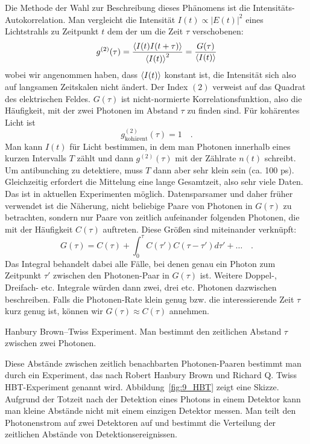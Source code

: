 Die Methode der Wahl zur Beschreibung dieses Phänomens ist die Intensitäts-Autokorrelation. Man vergleicht die Intensität $I(t) \propto |E(t)|^2$ eines Lichtstrahls zu Zeitpunkt $t$ dem der um die Zeit $\tau$ verschobenen:
\begin{equation}
    g^{(2)}(\tau) = \frac{\braket{I(t) I(t+ \tau)}}{\braket{I(t)}^2} =  \frac{G(\tau)}{\braket{I(t)}}
\end{equation}
wobei wir angenommen haben, dass $\braket{I(t)}$ konstant ist, die Intensität sich also auf langsamen Zeitskalen nicht ändert.
Der Index $(2)$ verweist auf das Quadrat des elektrischen Feldes. $G(\tau)$ ist nicht-normierte Korrelationsfunktion, also die Häufigkeit, mit der  zwei Photonen im Abstand $\tau$ zu finden sind. Für kohärentes Licht ist 
\begin{equation}
    g^{(2)}_\text{kohärent}(\tau) = 1 \quad .
\end{equation}
Man kann $I(t)$ für Licht bestimmen, in dem man Photonen innerhalb eines kurzen Intervalls $T$ zählt und dann $ g^{(2)}(\tau)$ mit der Zählrate $n(t)$ schreibt. Um antibunching zu detektiere, muss $T$ dann aber sehr klein sein (ca. 100 ps). Gleichzeitig erfordert die Mittelung eine lange Gesamtzeit, also sehr viele Daten. Das ist in aktuellen Experimenten möglich. Datensparsamer und daher früher verwendet ist die Näherung, nicht beliebige Paare von Photonen in  $G(\tau)$ zu betrachten, sondern nur Paare von zeitlich aufeinander folgenden Photonen, die mit der Häufigkeit $C(\tau)$ auftreten. Diese Größen sind miteinander verknüpft:
\begin{equation}
    G(\tau) = C(\tau) + \int_0^\tau C(\tau') C(\tau-\tau') d\tau' + \dots \quad .
\end{equation}
Das Integral behandelt dabei alle Fälle, bei denen genau ein Photon zum Zeitpunkt $\tau'$ zwischen den Photonen-Paar in $G(\tau)$ ist. Weitere Doppel-, Dreifach- etc. Integrale würden dann zwei, drei etc. Photonen dazwischen beschreiben. Falls die Photonen-Rate klein genug bzw. die interessierende Zeit $\tau$ kurz genug ist, können wir $G(\tau) \approx C(\tau)$ annehmen.

\begin{marginfigure}
    \caption{Hanbury Brown--Twiss Experiment. Man bestimmt den zeitlichen Abstand $\tau$ zwischen zwei Photonen. \label{fig:9_HBT}}
\end{marginfigure}

Diese Abstände zwischen zeitlich benachbarten Photonen-Paaren  bestimmt man durch ein Experiment, das nach  Robert Hanbury Brown und Richard Q. Twiss HBT-Experiment genannt wird. Abbildung~\ref{fig:9_HBT} zeigt eine Skizze. Aufgrund der Totzeit nach der Detektion eines Photons in einem Detektor  kann man kleine Abstände nicht mit einem einzigen Detektor messen. Man teilt den Photonenstrom auf zwei Detektoren auf und bestimmt die Verteilung der zeitlichen Abstände von Detektionsereignissen. 

